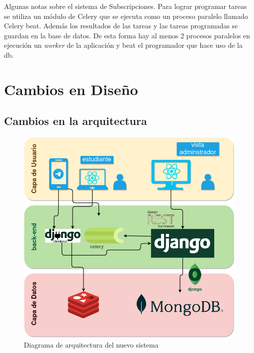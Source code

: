     \par Algunas notas sobre el sistema de Subscripciones. Para lograr programar tareas se utiliza un módulo de \gls{Celery} que se ejecuta como un proceso paralelo llamado Celery beat. Además los resultados de las tareas y las tareas programadas se guardan en la base de datos. De esta forma hay al menos 2 procesos paralelos en ejecución un \textit{worker} de la aplicación y beat el programador que hace uso de la db.

\newpage
\section{Cambios en Diseño}

    \subsection{Cambios en la arquitectura}

    \begin{figure}[h!]
        \centering
        \includegraphics[width=\textwidth]{media/diagramas/arquitectura/nueva_arquitectura.png}
        \caption[Nueva arquitectura]{Diagrama de arquitectura del nuevo sistema}
        \label{fig:arc-new}
    \end{figure}


